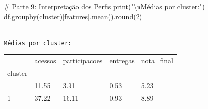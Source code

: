 \documentclass[
  letterpaper,
  DIV=11,
  numbers=noendperiod]{scrartcl}
\newenvironment{Shaded}{\begin{snugshade}}{\end{snugshade}}
\newcommand{\BuiltInTok}[1]{\textcolor[rgb]{0.00,0.23,0.31}{#1}}
\newcommand{\CharTok}[1]{\textcolor[rgb]{0.13,0.47,0.30}{#1}}
\newcommand{\CommentTok}[1]{\textcolor[rgb]{0.37,0.37,0.37}{#1}}
\newcommand{\DecValTok}[1]{\textcolor[rgb]{0.68,0.00,0.00}{#1}}
\newcommand{\NormalTok}[1]{\textcolor[rgb]{0.00,0.23,0.31}{#1}}
\newcommand{\StringTok}[1]{\textcolor[rgb]{0.13,0.47,0.30}{#1}}
\begin{document}
\begin{Shaded}
\begin{Highlighting}[]
\CommentTok{\# Parte 9: Interpretação dos Perfis}
\BuiltInTok{print}\NormalTok{(}\StringTok{"}\CharTok{\textbackslash{}n}\StringTok{Médias por cluster:"}\NormalTok{)}
\NormalTok{df.groupby(}\StringTok{\textquotesingle{}cluster\textquotesingle{}}\NormalTok{)[features].mean().}\BuiltInTok{round}\NormalTok{(}\DecValTok{2}\NormalTok{)}
\end{Highlighting}
\end{Shaded}

\begin{verbatim}

Médias por cluster:
\end{verbatim}

\begin{longtable}[]{@{}lllll@{}}
\toprule\noalign{}
& acessos & participacoes & entregas & nota\_final \\
cluster & & & & \\
\midrule\noalign{}
\endhead
\bottomrule\noalign{}
\endlastfoot
0 & 11.55 & 3.91 & 0.53 & 5.23 \\
1 & 37.22 & 16.11 & 0.93 & 8.89 \\
\end{longtable}
\end{document}
